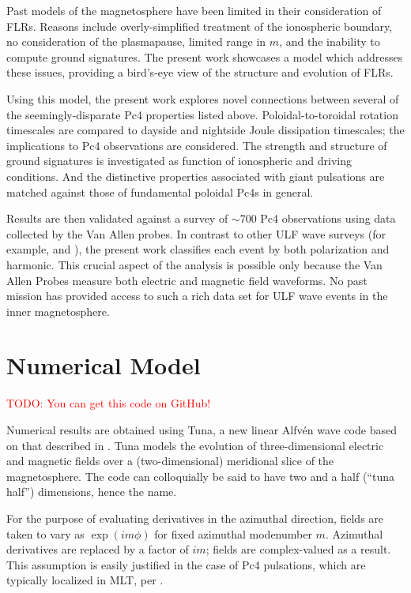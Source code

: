 \documentclass{article}
\newcommand{\about}{\ensuremath{\sim}}
\newcommand{\todo}[1]{ \textcolor{red}{TODO: #1} }
\newcommand{\Alfven}{Alfv\'en\xspace}
\newcommand{\lr}[1]{ \left( #1 \right) }
\renewcommand{\arg}[1]{\!\lr{#1}}
\newcommand{\azm}{\ensuremath{m}\xspace}
\begin{document}
Past models of the magnetosphere have been limited in their
consideration of FLRs. Reasons include overly-simplified treatment of
the ionospheric boundary, no consideration of the plasmapause, limited
range in \azm, and the inability to compute ground signatures. The
present work showcases a model which addresses these issues, providing a
bird’s-eye view of the structure and evolution of FLRs.

Using this model, the present work explores novel connections between
several of the seemingly-disparate Pc4 properties listed above.
Poloidal-to-toroidal rotation timescales are compared to dayside and
nightside Joule dissipation timescales; the implications to Pc4
observations are considered. The strength and structure of ground
signatures is investigated as function of ionospheric and driving
conditions. And the distinctive properties associated with giant
pulsations are matched against those of fundamental poloidal Pc4s in
general.

Results are then validated against a survey of \about700 Pc4
observations using data collected by the Van Allen probes. In contrast
to other ULF wave surveys (for example, \cite{dai_2015} and
\cite{motoba_2015}), the present work classifies each event by both
polarization and harmonic. This crucial aspect of the analysis is
possible only because the Van Allen Probes measure both electric and
magnetic field waveforms. No past mission has provided access to such a
rich data set for ULF wave events in the inner magnetosphere.


\section{Numerical Model}

\todo{You can get this code on GitHub!}

Numerical results are obtained using Tuna, a new linear \Alfven wave
code based on that described in \cite{lysak_2013}. Tuna models the
evolution of three-dimensional electric and magnetic fields over a
(two-dimensional) meridional slice of the magnetosphere. The code can
colloquially be said to have two and a half (``tuna half'') dimensions,
hence the name.

For the purpose of evaluating derivatives in the azimuthal direction,
fields are taken to vary as $\exp \arg{i \azm \phi}$ for fixed azimuthal
modenumber \azm. Azimuthal derivatives are replaced by a factor of
$i \azm$; fields are complex-valued as a result. This assumption is
easily justified in the case of Pc4 pulsations, which are typically
localized in MLT, per
\cite{anderson_1990,dai_2015,engebretson_1992,liu_2009}.
\end{document}
